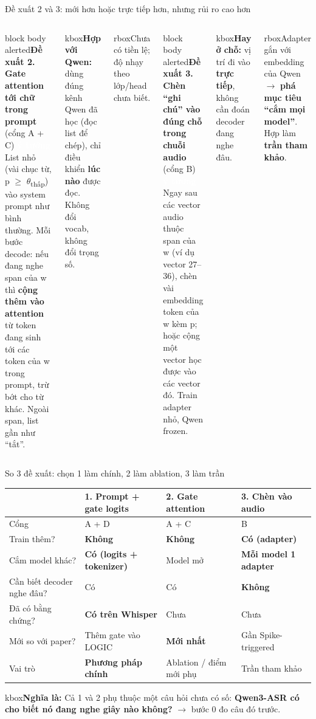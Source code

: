 \documentclass[aspectratio=169,xcolor=table]{beamer}
\newcommand{\bad}[1]{\textcolor{RiskRed}{\textbf{#1}}}
\newcommand{\good}[1]{\textcolor{GoodGreen}{\textbf{#1}}}
\newcommand{\ra}{$\rightarrow$}
\newcommand{\bsz}{\footnotesize}%
\newcommand{\nbox}[2][block body]{\begin{beamercolorbox}[sep=0.45em,rounded=true]{#1}\bsz #2\end{beamercolorbox}}
\newcommand{\nghiala}[1]{\begin{beamercolorbox}[sep=0.32em,rounded=true]{kbox}\bsz\textbf{Nghĩa là:} #1\end{beamercolorbox}}
\newcommand{\yeu}[1]{\begin{beamercolorbox}[sep=0.40em,rounded=true]{rbox}\bsz #1\end{beamercolorbox}}
\newcommand{\tagbox}[2]{{\scriptsize\colorbox{#1}{\textcolor{white}{\textbf{#2}}}}}
\newcommand{\YT}{\tagbox{Accent!85!black}{ý tưởng}}
\begin{document}
\begin{frame}{Đề xuất 2 và 3: mới hơn hoặc trực tiếp hơn, nhưng rủi ro cao hơn}
\begin{columns}[T]
\nbox[block body alerted]{\textbf{Đề xuất 2. Gate attention tới chữ trong prompt} (cổng A + C) \YT\\[2pt]
List nhỏ (vài chục từ, p $\geq$ $\theta$\textsubscript{thấp}) vào system prompt như bình thường. Mỗi bước decode: nếu đang nghe span của w thì \textbf{cộng thêm vào attention} từ token đang sinh tới các token của w trong prompt, trừ bớt cho từ khác. Ngoài span, list gần như ``tắt''.}
\vspace{0.06cm}
\nbox[kbox]{\textbf{Hợp với Qwen:} dùng đúng kênh Qwen đã học (đọc list để chép), chỉ điều khiển \textbf{lúc nào} được đọc. Không đổi vocab, không đổi trọng số.}
\vspace{0.06cm}
\yeu{Chưa có tiền lệ; độ nhạy theo lớp/head chưa biết.}
\nbox[block body alerted]{\textbf{Đề xuất 3. Chèn ``ghi chú'' vào đúng chỗ trong chuỗi audio} (cổng B) \YT\\[2pt]
Ngay sau các vector audio thuộc span của w (ví dụ vector 27--36), chèn vài embedding token của w kèm p; hoặc cộng một vector học được vào các vector đó. Train adapter nhỏ, Qwen frozen.}
\vspace{0.06cm}
\nbox[kbox]{\textbf{Hay ở chỗ:} vị trí đi vào \textbf{trực tiếp}, không cần đoán decoder đang nghe đâu.}
\vspace{0.06cm}
\yeu{Adapter gắn với embedding của Qwen \ra{} \bad{phá mục tiêu ``cắm mọi model''}. Hợp làm \textbf{trần tham khảo}.}
\end{columns}
\end{frame}

\begin{frame}{So 3 đề xuất: chọn 1 làm chính, 2 làm ablation, 3 làm trần}
\renewcommand{\arraystretch}{1.08}\footnotesize
\begin{tabular}{L{4.0cm}C{3.0cm}C{2.8cm}C{2.8cm}}
\toprule
 & \textbf{1. Prompt + gate logits} & 2. Gate attention & 3. Chèn vào audio \\
\midrule
Cổng & A + D & A + C & B \\
Train thêm? & \good{Không} & \good{Không} & \bad{Có (adapter)} \\
Cắm model khác? & \good{Có (logits + tokenizer)} & Model mở & \bad{Mỗi model 1 adapter} \\
Cần biết decoder nghe đâu? & Có & Có & \good{Không} \\
Đã có bằng chứng? & \good{Có trên Whisper} & Chưa & Chưa \\
Mới so với paper? & Thêm gate vào LOGIC & \good{Mới nhất} & Gần Spike-triggered \\
\midrule
{} Vai trò & \textbf{Phương pháp chính} & Ablation / điểm mới phụ & Trần tham khảo \\
\bottomrule
\end{tabular}
\vspace{0.12cm}

\nghiala{Cả 1 và 2 phụ thuộc một câu hỏi chưa có số: \textbf{Qwen3-ASR có cho biết nó đang nghe giây nào không?} \ra{} bước 0 đo câu đó trước.}
\end{frame}
\end{document}
